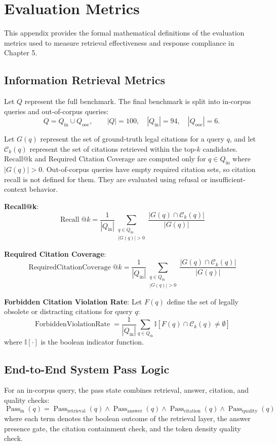 \chapter{Evaluation Metrics}
\label{app:evaluation-metrics}

This appendix provides the formal mathematical definitions of the evaluation metrics used to measure retrieval effectiveness and response compliance in Chapter 5.

\section{Information Retrieval Metrics}
Let $Q$ represent the full benchmark. The final benchmark is split into in-corpus queries and out-of-corpus queries:
\[
Q = Q_{\mathrm{in}} \cup Q_{\mathrm{ooc}},
\qquad
|Q| = 100,\quad |Q_{\mathrm{in}}| = 94,\quad |Q_{\mathrm{ooc}}| = 6.
\]

Let $G(q)$ represent the set of ground-truth legal citations for a query $q$, and let $\mathcal{C}_k(q)$ represent the set of citations retrieved within the top-$k$ candidates. Recall@k and Required Citation Coverage are computed only for $q \in Q_{\mathrm{in}}$ where $|G(q)| > 0$. Out-of-corpus queries have empty required citation sets, so citation recall is not defined for them. They are evaluated using refusal or insufficient-context behavior.

\textbf{Recall@k}:
\[
\operatorname{Recall}@k =
\frac{1}{|Q_{\mathrm{in}}|}
\sum_{\substack{q \in Q_{\mathrm{in}}\\ |G(q)| > 0}}
\frac{|G(q) \cap \mathcal{C}_k(q)|}{|G(q)|}
\]

\textbf{Required Citation Coverage}:
\[
\operatorname{RequiredCitationCoverage}@k =
\frac{1}{|Q_{\mathrm{in}}|}
\sum_{\substack{q \in Q_{\mathrm{in}}\\ |G(q)| > 0}}
\frac{|G(q) \cap \mathcal{C}_k(q)|}{|G(q)|}
\]

\textbf{Forbidden Citation Violation Rate}:
Let $F(q)$ define the set of legally obsolete or distracting citations for query $q$:
\[
\operatorname{ForbiddenViolationRate} =
\frac{1}{|Q_{\mathrm{in}}|}
\sum_{q \in Q_{\mathrm{in}}}
\mathbb{I}\left[ F(q) \cap \mathcal{C}_k(q) \neq \emptyset \right]
\]
where $\mathbb{I}\left[ \cdot \right]$ is the boolean indicator function.

\section{End-to-End System Pass Logic}
For an in-corpus query, the pass state combines retrieval, answer, citation, and quality checks:
\[
\operatorname{Pass}_{\mathrm{in}}(q) =
\operatorname{Pass}_{\mathrm{retrieval}}(q)
\land \operatorname{Pass}_{\mathrm{answer}}(q)
\land \operatorname{Pass}_{\mathrm{citation}}(q)
\land \operatorname{Pass}_{\mathrm{quality}}(q)
\]
where each term denotes the boolean outcome of the retrieval layer, the answer presence gate, the citation containment check, and the token density quality check.

